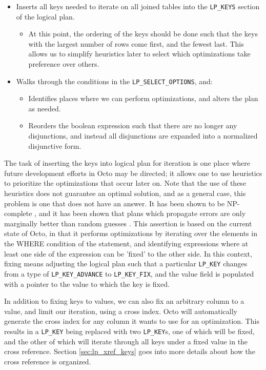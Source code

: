 \documentclass[]{article}
\def\code#1{\texttt{#1}}
\begin{document}
\begin{itemize}
	\item Inserts all keys needed to iterate on all joined tables into the \code{LP\_KEYS} section of the logical plan.
	\begin{itemize}
		\item At this point, the ordering of the keys should be done such that the keys with the largest number of rows come first, and the fewest last. This allows us to simplify heuristics later to select which optimizations take preference over others.
	\end{itemize}
	\item Walks through the conditions in the \code{LP\_SELECT\_OPTIONS}, and:
	\begin{itemize}
		\item Identifies places where we can perform optimizations, and alters the plan as needed.
		\item Reorders the boolean expression such that there are no longer any disjunctions, and instead all disjunctions are expanded into a normalized disjunctive form.
	\end{itemize}
\end{itemize}

The task of inserting the keys into logical plan for iteration is one place where future development efforts in Octo may be directed; it allows one to use heuristics to prioritize the optimizations that occur later on.
Note that the use of these heuristics does not guarantee an optimal solution, and as a general case, this problem is one that does not have an answer.
It has been shown to be NP-complete \cite{cook_complexity_1971}, and it has been shown that plans which propagate errors are only marginally better than random guesses \cite{ioannidis_propagation_1991}.
This assertion is based on the current state of Octo, in that it performs optimizations by iterating over the elements in the WHERE condition of the statement, and identifying expressions where at least one side of the expression can be 'fixed' to the other side.
In this context, fixing means adjusting the logical plan such that a particular \code{LP\_KEY} changes from a type of \code{LP\_KEY\_ADVANCE} to \code{LP\_KEY\_FIX}, and the value field is populated with a pointer to the value to which the key is fixed.

In addition to fixing keys to values, we can also fix an arbitrary column to a value, and limit our iteration, using a cross index.
Octo will automatically generate the cross index for any column it wants to use for an optimization.
This results in a \code{LP\_KEY} being replaced with two \code{LP\_KEY}s, one of which will be fixed, and the other of which will iterate through all keys under a fixed value in the cross reference.
Section \ref{sec:lp_xref_keys} goes into more details about how the cross reference is organized.
\end{document}
